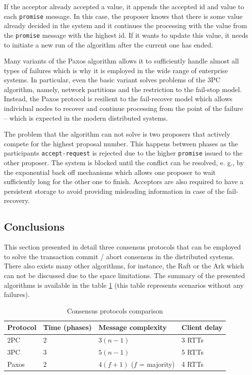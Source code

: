 \documentclass[oneside,
  digital, %
  table,   %
  nolof,     %
  nolot,     %
]{fithesis3}
\begin{document}
If the acceptor already accepted a value, it appends the accepted id and value to each \texttt{promise} message. In this case, the proposer knows that there is some value already decided in the system and it continues the processing with the value from the \texttt{promise} message with the highest id. If it wants to update this value, it needs to initiate a new run of the algorithm after the current one has ended. 

Many variants of the Paxos algorithm allows it to sufficiently handle almost all types of failures which is why it is employed in the wide range of enterprise systems. In particular, even the basic variant solves  problems of the 3PC algorithm, namely, network partitions and the restriction to the fail-stop model. Instead, the Paxos protocol is resilient to the fail-recover model which allows individual nodes to recover and continue processing from the point of the failure -- which is expected in the modern distributed systems.

The problem that the algorithm can not solve is two proposers that actively compete for the highest proposal number. This happens between phases as the participants \texttt{accept-request} is rejected due to the higher \texttt{promise} issued to the other proposer. The system is blocked until the conflict can be resolved, e. g., by the exponential back off mechanisms which allows one proposer to wait sufficiently long for the other one to finish. Acceptors are also required to have a persistent storage to avoid providing misleading information in case of the fail-recovery.

\subsection{Conclusions}

This section presented in detail three consensus protocols that can be employed to solve the transaction commit / abort consensus in the distributed systems. There also exists many other algorithms, for instance, the Raft or the Ark which can not be discussed due to the space limitations. The summary of the presented algorithms is available in the table \ref{tab:consensus-protocols-comparison} (this table represents scenarios without any failures).

\begin{table}
    \begin{tabularx}{\textwidth}{lllX}
        \toprule
        Protocol & Time (phases) & Message complexity & Client delay \\
        \midrule
        2PC & 2 & $3(n - 1)$ & 3 RTTs \\
        3PC & 3 & $5(n - 1)$ & 5 RTTs \\
        Paxos & 2 & $4(f + 1)$ ($f$ = majority) & 4 RTTs \\
        \bottomrule
    \end{tabularx}
    \caption{Consensus protocols comparison}
    \label{tab:consensus-protocols-comparison}
\end{table}
\end{document}
